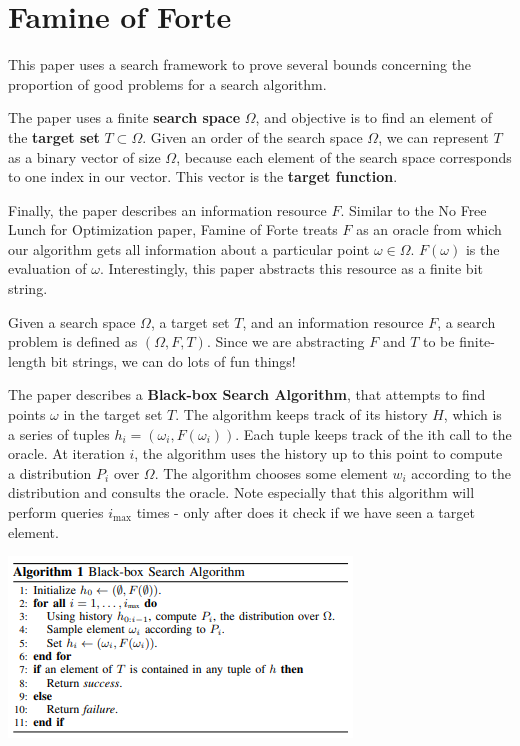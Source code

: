 \documentclass{article}
\begin{document}
\section*{Famine of Forte}
This paper uses a search framework to prove several bounds concerning the proportion of good problems for a search algorithm. 

The paper uses a finite \textbf{search space} $\Omega$, and objective is to find an element of the \textbf{target set} $T \subset \Omega$. Given an order of the search space $\Omega$, we can represent $T$ as a binary vector of size $\Omega$, because each element of the search space corresponds to one index in our vector. This vector is the \textbf{target function}. 

Finally, the paper describes an information resource $F$. Similar to the No Free Lunch for Optimization paper, Famine of Forte treats $F$ as an oracle from which our algorithm gets all information about a particular point $\omega \in \Omega$. $F(\omega)$ is the evaluation of $\omega$. Interestingly, this paper abstracts this resource as a finite bit string. 

Given a search space $\Omega$, a target set $T$, and an information resource $F$, a search problem is defined as $(\Omega, F, T)$. Since we are abstracting $F$ and $T$ to be finite-length bit strings, we can do lots of fun things!

The paper describes a \textbf{Black-box Search Algorithm}, that attempts to find points $\omega$ in the target set $T$. The algorithm keeps track of its history $H$, which is a series of tuples $h_i = (\omega_i, F(\omega_i))$. Each tuple keeps track of the ith call to the oracle. At iteration $i$, the algorithm uses the history up to this point to compute a distribution $P_i$ over $\Omega$. The algorithm chooses some element $w_i$ according to the distribution and consults the oracle. Note especially that this algorithm will perform queries $i_{\text{max}}$ times - only after does it check if we have seen a target element.

\begin{center}
    \includegraphics{BlackBoxAlgo.PNG}
\end{center}
\end{document}
